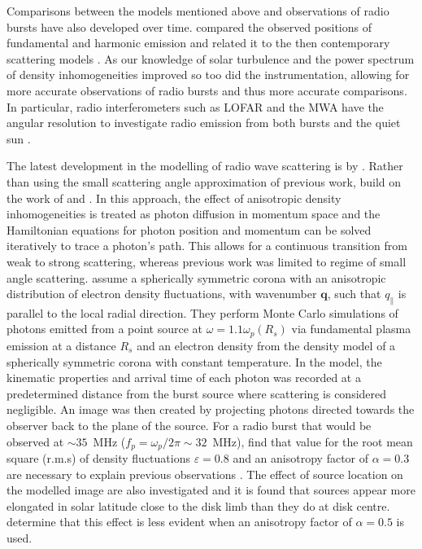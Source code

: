 Comparisons between the models mentioned above and observations of radio bursts have also developed over time. \cite{Stewart1972} compared the observed positions of fundamental and harmonic emission and related it to the then contemporary scattering models \citep[e.g.][]{Fokker1965,Steinberg1971}. As our knowledge of solar turbulence and the power spectrum of density inhomogeneities improved so too did the instrumentation, allowing for more accurate observations of radio bursts and thus more accurate comparisons. In particular, radio interferometers such as LOFAR and the MWA have the angular resolution to investigate radio emission from both bursts \citep[e.g.][]{Zhang2020} and the quiet sun \citep[e.g.][]{Sharma2020}. 

The latest development in the modelling of radio wave scattering is by \cite{Kontar2019}. Rather than using the small scattering angle approximation of previous work, \cite{Kontar2019} build on the work of \cite{Arzner1999} and \cite{Bian2019}. In this approach, the effect of anisotropic density inhomogeneities is treated as photon diffusion in momentum space and the Hamiltonian equations for photon position and momentum can be solved iteratively to trace a photon's path. This allows for a continuous transition from weak to strong scattering, whereas previous work was limited to regime of small angle scattering. \cite{Kontar2019} assume a spherically symmetric corona with an anisotropic distribution of electron density fluctuations, with wavenumber $\mathbf{q}$, such that $q_\parallel$ is parallel to the local radial direction. They perform Monte Carlo simulations of photons emitted from a point source at $\omega = 1.1 \omega_p(R_s)$ via fundamental plasma emission at a distance $R_s$ and an electron density from the \cite{Parker1960} density model of a spherically symmetric corona with constant temperature. In the \cite{Kontar2019} model, the kinematic properties and arrival time of each photon was recorded at a predetermined distance from the burst source where scattering is considered negligible. An image was then created by projecting photons directed towards the observer back to the plane of the source. For a radio burst that would be observed at $\sim 35$~MHz ($f_p = \omega_p/2 \pi \sim 32$~MHz), \cite{Kontar2019} find that value for the root mean square (r.m.s) of density fluctuations $\varepsilon = 0.8$ and an anisotropy factor of $\alpha = 0.3$ are necessary to explain previous observations \citep{Kontar2017}. The effect of source location on the modelled image are also investigated and it is found that sources appear more elongated in solar latitude close to the disk limb than they do at disk centre. \cite{Kontar2019} determine that this effect is less evident when an anisotropy factor of $\alpha = 0.5$ is used.


